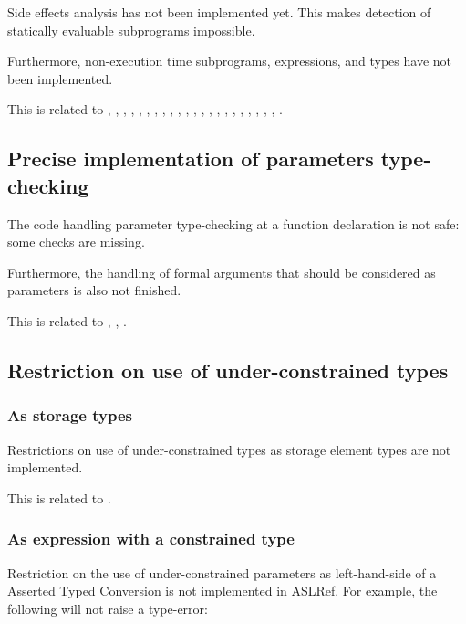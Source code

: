 \documentclass{book}
\begin{document}
Side effects analysis has not been implemented yet.
%
This makes detection of statically evaluable subprograms impossible.

Furthermore, non-execution time subprograms, expressions, and types have not
been implemented.

This is related to , , , ,
, , , , ,
, , , , ,
, , , , ,
, , , .

\subsection{Precise implementation of parameters type-checking}

The code handling parameter type-checking at a function declaration is not
safe: some checks are missing.

Furthermore, the handling of formal arguments that should be considered as
parameters is also not finished.

This is related to , , .

\subsection{Restriction on use of under-constrained types}

\subsubsection{As storage types}
Restrictions on use of under-constrained types as storage element types are not
implemented.

This is related to .

\subsubsection{As expression with a constrained type}

Restriction on the use of under-constrained parameters as left-hand-side of a
Asserted Typed Conversion is not implemented in ASLRef.
%
For example, the following will not raise a type-error:
\end{document}
